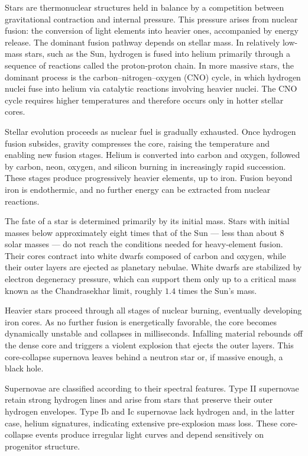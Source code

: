 Stars are thermonuclear structures held in balance by a competition between gravitational contraction and internal pressure. This pressure arises from nuclear fusion: the conversion of light elements into heavier ones, accompanied by energy release. The dominant fusion pathway depends on stellar mass. In relatively low-mass stars, such as the Sun, hydrogen is fused into helium primarily through a sequence of reactions called the proton-proton chain. In more massive stars, the dominant process is the carbon–nitrogen–oxygen (CNO) cycle, in which hydrogen nuclei fuse into helium via catalytic reactions involving heavier nuclei. The CNO cycle requires higher temperatures and therefore occurs only in hotter stellar cores.

Stellar evolution proceeds as nuclear fuel is gradually exhausted. Once hydrogen fusion subsides, gravity compresses the core, raising the temperature and enabling new fusion stages. Helium is converted into carbon and oxygen, followed by carbon, neon, oxygen, and silicon burning in increasingly rapid succession. These stages produce progressively heavier elements, up to iron. Fusion beyond iron is endothermic, and no further energy can be extracted from nuclear reactions.

The fate of a star is determined primarily by its initial mass. Stars with initial masses below approximately eight times that of the Sun — less than about $8$ solar masses — do not reach the conditions needed for heavy-element fusion. Their cores contract into white dwarfs composed of carbon and oxygen, while their outer layers are ejected as planetary nebulae. White dwarfs are stabilized by electron degeneracy pressure, which can support them only up to a critical mass known as the Chandrasekhar limit, roughly $1.4$ times the Sun's mass.

Heavier stars proceed through all stages of nuclear burning, eventually developing iron cores. As no further fusion is energetically favorable, the core becomes dynamically unstable and collapses in milliseconds. Infalling material rebounds off the dense core and triggers a violent explosion that ejects the outer layers. This core-collapse supernova leaves behind a neutron star or, if massive enough, a black hole.

Supernovae are classified according to their spectral features. Type II supernovae retain strong hydrogen lines and arise from stars that preserve their outer hydrogen envelopes. Type Ib and Ic supernovae lack hydrogen and, in the latter case, helium signatures, indicating extensive pre-explosion mass loss. These core-collapse events produce irregular light curves and depend sensitively on progenitor structure.

